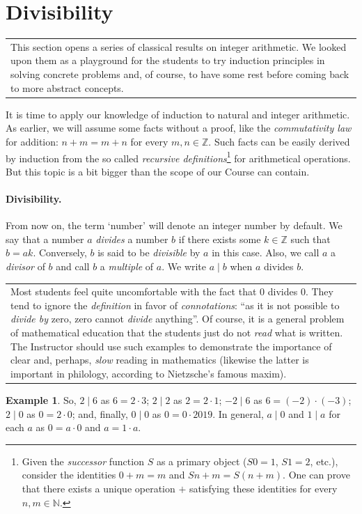 \documentclass[12pt,notitlepage]{article}
\theoremstyle{plain}
\theoremstyle{definition}
\newtheorem{exm}[thm]{Example}
\theoremstyle{plain}
\newcommand{\N}{\mathbb{N}}
\newcommand{\Z}{\mathbb{Z}}
\newcommand{\1}{\mathbf{1}}
\newcommand{\0}{\mathbf{0}}
\newcommand{\dvd}{\mathop{\mid}}
\newcommand{\mcomm}[1]{
\medskip\noindent\begin{tabular}{| l}
\parbox{0.99\textwidth}{{\small
#1 }}\end{tabular}
\smallskip}
\begin{document}
\newpage
\section{Divisibility}
\mcomm{This section opens a series of classical results on integer arithmetic. We looked upon them as a playground for the students to try induction principles in solving concrete problems  and, of course, to have some rest before coming back to more abstract concepts.}

It is time to apply our knowledge of induction to natural and integer arithmetic. As earlier, we will assume some facts without a proof, like the \emph{commutativity law} for addition: $n + m = m + n$ for every $m, n \in \Z$. Such facts can be easily derived by induction from the so called \emph{recursive definitions}\footnote{Given the \emph{successor} function $S$ as a primary object ($S 0 = 1$, $S 1 = 2$, etc.), consider the identities $0 + m = m$ and $S n + m = S(n + m)$. One can prove that there exists a unique operation ${+}$ satisfying these identities for every $n, m  \in \N$.} for arithmetical operations. But this topic is a bit bigger than the scope of our Course can contain.

\paragraph{Divisibility.} From now on, the term `number' will denote an integer number by default. We say that a number $a$ \emph{divides} a number $b$ if there exists some $k \in \Z$ such that $b = ak$. Conversely, $b$ is said to be \emph{divisible} by $a$ in this case. Also, we call $a$ a \emph{divisor} of $b$ and call $b$ a \emph{multiple} of $a$. We write $a \dvd b$ when $a$ divides $b$.

\mcomm{Most students feel quite uncomfortable with the fact that $0$ divides $0$. They tend to ignore the \emph{definition} in favor of \emph{connotations}: ``as it is not possible to \emph{divide by} zero, zero cannot \emph{divide} anything''. Of course, it is a general problem of mathematical education that the students just do not \emph{read} what is written.  The Instructor should use such examples to demonstrate the importance of clear and, perhaps, \emph{slow} reading in mathematics (likewise the latter is important in philology, according to Nietzsche's famous maxim).}
\begin{exm}
So, $2 \dvd 6$ as $6 = 2 \cdot 3$; $2 \dvd 2$ as $2 = 2 \cdot 1$; $-2 \dvd 6$ as $6 = (-2) \cdot (-3)$; $2 \dvd 0$ as $0 = 2 \cdot 0$; and, finally, $0 \dvd 0$ as $0 = 0 \cdot 2019$. In general, $a \dvd 0$  and $1 \dvd a$ for each $a$ as $0 = a \cdot 0$ and $a = 1 \cdot a$.
\end{exm}
\end{document}
